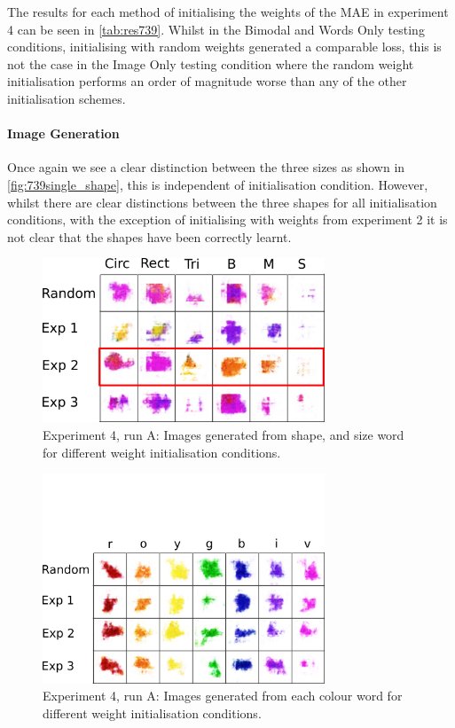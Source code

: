 The results for each method of initialising the weights of the \ac{MAE} in experiment 4 can be seen in \autoref{tab:res739}. Whilst in the Bimodal and Words Only testing conditions, initialising with random weights generated a comparable loss, this is not the case in the Image Only testing condition where the random weight initialisation performs an order of magnitude worse than any of the other initialisation schemes.


\paragraph{Image Generation}

Once again we see a clear distinction between the three sizes as shown in \autoref{fig:739single_shape}, this is independent of initialisation condition. However, whilst there are clear distinctions between the three shapes for all initialisation conditions, with the exception of initialising with weights from experiment 2 it is not clear that the shapes have been correctly learnt.

\begin{figure}[h]
\centering
\includegraphics[width=0.75\textwidth]{Figs/shapes/singlelabel739_shape.png}
\caption{Experiment 4, run A: Images generated from shape, and size word for different weight initialisation conditions.}
\label{fig:739single_shape}
\end{figure}



\begin{figure}[h!]
\centering
\includegraphics[width=0.75\textwidth]{Figs/shapes/singlelabel739_col.png}
\caption{Experiment 4, run A: Images generated from each colour word for different weight initialisation conditions.}
\label{fig:739single_col}
\end{figure}

